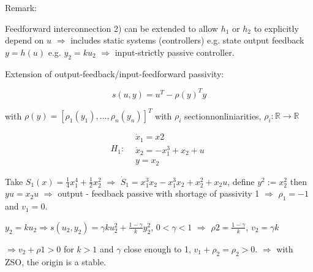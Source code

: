 Remark:

Feedforward interconnection 2) can be extended to allow $h_1$ or $h_2$ to explicitly depend
on $u$ $\Rightarrow$ includes static systems (controllers) e.g. state output feedback $y=h(u)$
e.g. $y_2=ku_2$ $\Rightarrow$ input-strictly passive controller.

Extension of output-feedback/input-feedforward passivity:

$$s(u,y)=u^T-\rho(y)^Ty$$

with $\rho(y) = [\rho_1(y_1),\dots,\rho_n(y_n)]^T$ with $\rho_i$ sectionnonliniarities, 
$\rho_i: \mathbb{R}\rightarrow\mathbb{R}$

\begin{Example}
\begin{equation*}
H_1: 
\begin{split}
 &\dot x_1 = x2 \\
 &\dot x_2 = -x_1^3 + x_2 + u \\
 &y = x_2
\end{split}
\end{equation*}

Take $S_1(x) = \frac{1}{4} x_1^4 + \frac{1}{2}x_2^2$ $\Rightarrow$ 
$\dot S_1 = x_1^3x_2 - x_1^3x_2 + x_2^2 + x_2u$, define $y^2:=x_2^2$ then
$yu=x_2u$ $\Rightarrow$ output - feedback passive with shortage of passivity 1
$\Rightarrow$ $\rho_1=-1$ and $v_1 = 0$.



$y_2 = ku_2 \Rightarrow s(u_2,y_2)= \gamma ku_2^2 + \frac{1-\gamma}{k}y_2^2$,  $0<\gamma<1$ $\Rightarrow$ 
$\rho 2 = \frac{1-\gamma}{k}$, $v_2 = \gamma k$

$\Rightarrow v_2+\rho 1 > 0$ for $k>1$ and $\gamma$ close enough to 1, $v_1+\rho_2 = \rho_2 > 0$.
$\Rightarrow$ with ZSO, the origin is a stable.

\end{Example}